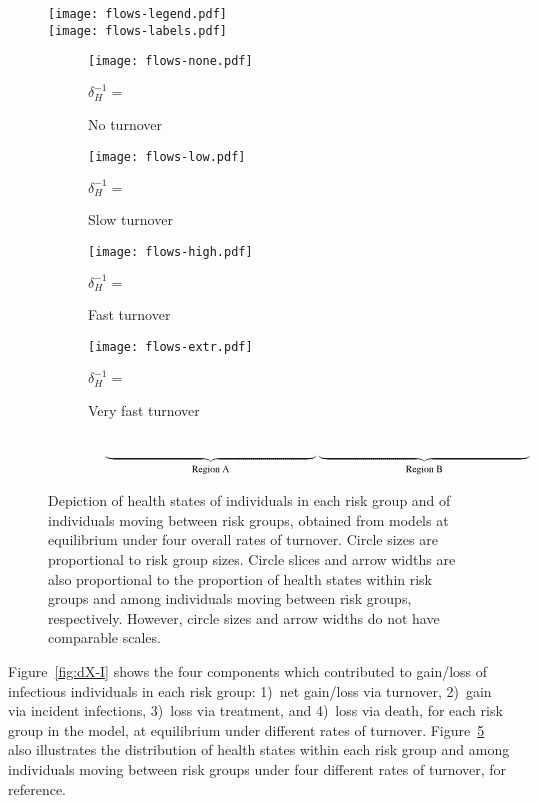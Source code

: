 \begin{figure}[!tbp]
  \centering
  \texttt{[image: flows-legend.pdf]}\\
  \texttt{[image: flows-labels.pdf]}
  \begin{subfigure}[t]{0.22\linewidth}
    \centering
    \texttt{[image: flows-none.pdf]}
    \caption{No turnover}
    \footnotesize $\delta_H^{-1} = $
    \label{fig:flows-none}
  \end{subfigure}%
  \begin{subfigure}[t]{0.22\linewidth}
    \centering
    \texttt{[image: flows-low.pdf]}
    \caption{Slow turnover}
    \footnotesize $\delta_H^{-1} = $
    \label{fig:flows-low}
  \end{subfigure}%
  \begin{subfigure}[t]{0.22\linewidth}
    \centering
    \texttt{[image: flows-high.pdf]}
    \caption{Fast turnover}
    \footnotesize $\delta_H^{-1} = $
    \label{fig:flows-high}
  \end{subfigure}%
  \begin{subfigure}[t]{0.22\linewidth}
    \centering
    \texttt{[image: flows-extr.pdf]}
    \caption{Very fast turnover}
    \footnotesize $\delta_H^{-1} = $
    \label{fig:flows-extr}
  \end{subfigure}\\[0.5em]
  $\null\hspace{0.11\linewidth}
  \underbrace{\hspace{0.44\linewidth}}_{\textrm{Region~A}}
  \underbrace{\hspace{0.44\linewidth}}_{\textrm{Region~B}}$
  \caption{Depiction of health states of individuals in each risk group
    and of individuals moving between risk groups,
    obtained from models at equilibrium
    under four overall rates of turnover.
    Circle sizes are proportional to risk group sizes.
    Circle slices and arrow widths are also proportional to
    the proportion of health states within risk groups and
    among individuals moving between risk groups, respectively.
    However, circle sizes and arrow widths do not have comparable scales.}
  \label{fig:flows}
\end{figure}
\par
Figure~\ref{fig:dX-I} shows the four components which contributed to 
gain/loss of infectious individuals in each risk group:
1)~net gain/loss via turnover,
2)~gain via incident infections,
3)~loss via treatment, and
4)~loss via death,
for each risk group in the model,
at equilibrium under different rates of turnover.
Figure~\ref{fig:flows} also illustrates
the distribution of health states within each risk group
and among individuals moving between risk groups
under four different rates of turnover, for reference.
